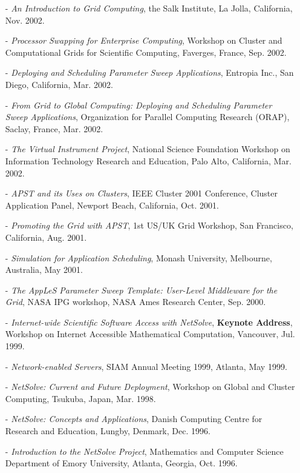 \documentclass[times,11pt]{letter}
\begin{document}
\begin{itemize}
\item[-] {\it An Introduction to Grid Computing}, the Salk Institute,
La Jolla, California, Nov. 2002.

\item[-] {\it Processor Swapping for Enterprise Computing}, Workshop
on Cluster and Computational Grids for Scientific Computing, Faverges,
France, Sep. 2002.

\item[-] {\it Deploying and Scheduling Parameter Sweep Applications},
Entropia Inc., San Diego, California, Mar. 2002.

\item[-] {\it From Grid to Global Computing: Deploying and Scheduling
Parameter Sweep Applications}, Organization for Parallel Computing
Research (ORAP), Saclay, France, Mar. 2002.

\item[-] {\it The Virtual Instrument Project}, National Science Foundation
Workshop on Information Technology Research and Education, Palo Alto,
California, Mar. 2002.

\item[-] {\it APST and its Uses on Clusters}, IEEE Cluster 2001
Conference, Cluster Application Panel, Newport Beach, California,
Oct. 2001.

\item[-] {\it Promoting the Grid with APST}, 1st US/UK Grid Workshop,
San Francisco, California, Aug. 2001.

\item[-] {\it Simulation for Application Scheduling}, Monash University,
Melbourne, Australia, May 2001.

\item[-] {\it The AppLeS Parameter Sweep Template: User-Level Middleware
for the Grid}, NASA IPG workshop, NASA Ames Research Center, Sep.
2000.

\item[-] {\it Internet-wide Scientific Software Access with NetSolve},
{\bf Keynote Address},
Workshop on Internet Accessible Mathematical Computation, Vancouver,
Jul. 1999.

\item[-] {\it Network-enabled Servers}, SIAM Annual Meeting 1999, Atlanta,
May 1999.

\item[-] {\it NetSolve: Current and Future Deployment}, Workshop on
Global and Cluster Computing, Tsukuba, Japan, Mar. 1998.

\item[-] {\it NetSolve: Concepts and Applications}, Danish Computing
Centre for Research and Education, Lungby, Denmark, Dec. 1996.

\item[-] {\it Introduction to the NetSolve Project}, Mathematics and
Computer Science Department of Emory University, Atlanta, Georgia, Oct. 1996.

\end{itemize}
\end{document}
